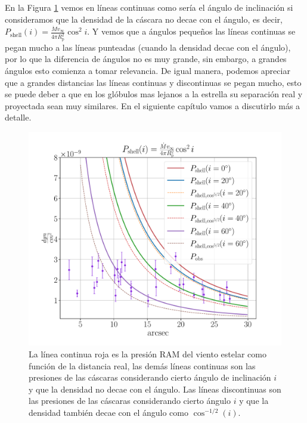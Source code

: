 \documentclass{book}
\begin{document}
En la Figura \ref{fig:ncos_2} vemos en líneas continuas como sería el
ángulo de inclinación si consideramos que la densidad de la cáscara no
decae con el ángulo, es decir,
$P_\mathrm{shell}(i)=\frac{\dot{M}v_\infty}{4\pi R_\mathrm{p}^2}\cos^2i$. Y
vemos que a ángulos pequeños las líneas continuas se pegan mucho a las
líneas punteadas (cuando la densidad decae con el ángulo), por lo que
la diferencia de ángulos no es muy grande, sin embargo, a grandes
ángulos esto comienza a tomar relevancia. De igual manera, podemos
apreciar que a grandes distancias las líneas continuas y discontinuas
se pegan mucho, esto se puede deber a que en los glóbulos mas lejanos
a la estrella su separación real y proyectada sean muy similares. En
el siguiente capítulo vamos a discutirlo más a detalle.

\begin{figure}[htb]
    \centering
    \includegraphics[width=\textwidth]{imagenes_corregidas/S_2.pdf}
    \caption{La línea continua roja es la presión RAM del viento
      estelar como función de la distancia real, las demás líneas
      continuas son las presiones de las cáscaras considerando cierto
      ángulo de inclinación $i$ y que la densidad no decae con el
      ángulo. Las líneas discontinuas son las presiones de las
      cáscaras considerando cierto ángulo $i$ y que la densidad
      también decae con el ángulo como $\cos^{-1/2}(i)$.}
    \label{fig:ncos_2}
\end{figure}
\end{document}
